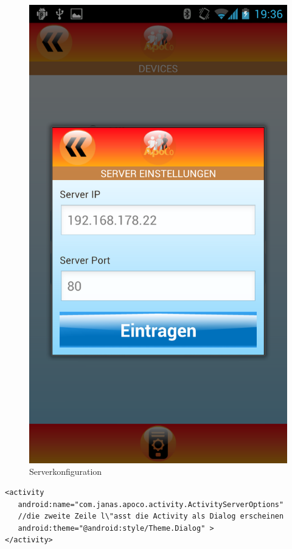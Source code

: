 \begin{figure}[h]
  \centering
  \includegraphics[scale=0.2]{screenshots/kapitel4/server_einstellungen.png}
  \caption{Serverkonfiguration}
  
\end{figure}

 \begin{lstlisting}[caption={Activity als Dialogfenster erscheinen lassen}]
 <activity
   android:name="com.janas.apoco.activity.ActivityServerOptions"
   //die zweite Zeile l\"asst die Activity als Dialog erscheinen
   android:theme="@android:style/Theme.Dialog" >
</activity>
\end{lstlisting}


